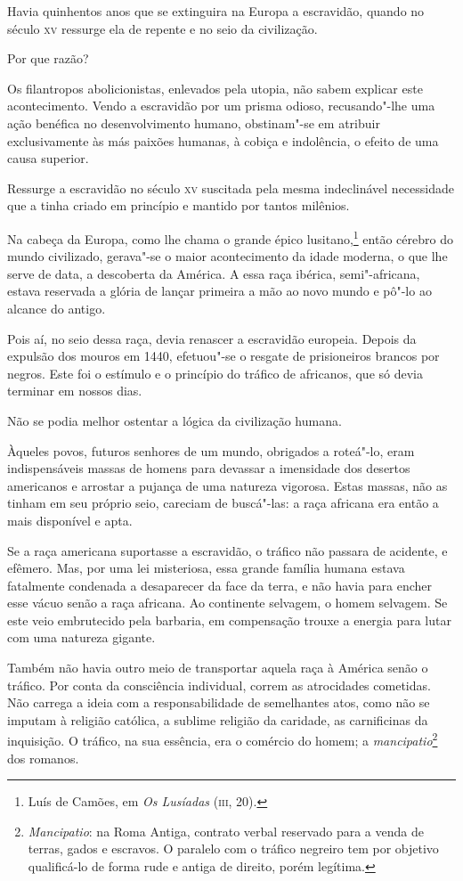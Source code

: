 Havia quinhentos anos que se extinguira na Europa a escravidão, quando
no século \textsc{xv} ressurge ela de repente e no seio da civilização. 

Por que razão? 

Os filantropos abolicionistas, enlevados pela utopia, não sabem explicar
este acontecimento. Vendo a escravidão por um prisma odioso,
recusando"-lhe uma ação benéfica no desenvolvimento humano,
obstinam"-se em atribuir exclusivamente às más paixões humanas, à
cobiça e indolência, o efeito de uma causa superior. 

Ressurge a escravidão no século \textsc{xv} suscitada pela mesma indeclinável
necessidade que a tinha criado em princípio e mantido por tantos milênios. 

Na cabeça da Europa, como lhe chama o grande épico
lusitano,\footnote{Luís de Camões, em \textit{Os Lusíadas} (\textsc{iii}, 20).}
 então cérebro do mundo civilizado, gerava"-se o maior acontecimento da
idade moderna, o que lhe serve de data, a descoberta da América. A essa
raça ibérica, semi"-africana, estava reservada a glória de lançar
primeira a mão ao novo mundo e pô"-lo ao alcance do antigo. 

Pois aí, no seio dessa raça, devia renascer a escravidão europeia.
Depois da expulsão dos mouros em 1440, efetuou"-se o resgate de
prisioneiros brancos por negros. Este foi o estímulo e o princípio do
tráfico de africanos, que só devia terminar em nossos dias. 

Não se podia melhor ostentar a lógica da civilização humana.

Àqueles povos, futuros senhores de um mundo, obrigados a roteá"-lo,
eram indispensáveis massas de homens para devassar a imensidade dos
desertos americanos e arrostar a pujança de uma natureza vigorosa.
Estas massas, não as tinham em seu próprio seio, careciam de
buscá"-las: a raça africana era então a mais disponível e apta. 

Se a raça americana suportasse a escravidão, o tráfico não passara de \label{racaamericana}
acidente, e efêmero. Mas, por uma lei misteriosa, essa grande família
humana estava fatalmente condenada a desaparecer da face da terra, e
não havia para encher esse vácuo senão a raça africana. Ao continente
selvagem, o homem selvagem. Se este veio embrutecido pela barbaria, em
compensação trouxe a energia para lutar com uma natureza gigante. 

Também não havia outro meio de transportar aquela raça à América senão o
tráfico. Por conta da consciência individual, correm as atrocidades
cometidas. Não carrega a ideia com a responsabilidade de semelhantes
atos, como não se imputam à religião católica, a sublime religião da
caridade, as carnificinas da inquisição. O tráfico, na sua essência,
era o comércio do homem; a
\textit{mancipatio}\footnote{ \textit{Mancipatio}: na Roma Antiga, contrato verbal 
reservado para a venda de terras, gados e escravos. O paralelo com o tráfico negreiro 
tem por objetivo qualificá-lo de forma rude e antiga de direito, porém legítima.} dos romanos. 

